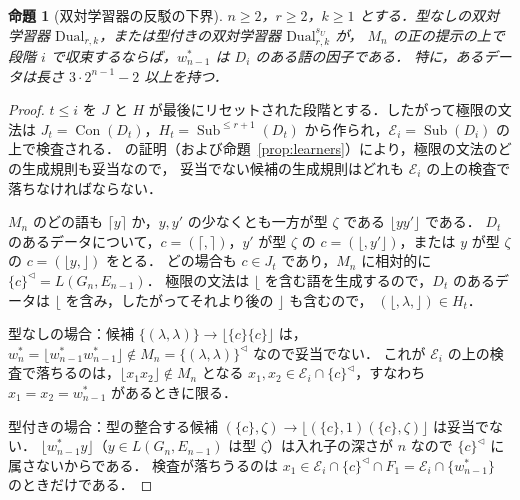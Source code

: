\documentclass[11pt,a4paper]{ltjsarticle}
\numberwithin{equation}{section}
\theoremstyle{plain}
\newtheorem{proposition}[theorem]{命題}
\theoremstyle{definition}
\theoremstyle{remark}
\theoremstyle{plain}
\newcommand{\eps}{\lambda}
\newcommand{\Lc}{^{\lhd}}
\newcommand{\Sub}{\operatorname{Sub}}
\newcommand{\Con}{\operatorname{Con}}
\newcommand{\Lfl}{\lfloor}
\newcommand{\Rfl}{\rfloor}
\newcommand{\Lce}{\lceil}
\newcommand{\Rce}{\rceil}
\begin{document}
\begin{proposition}[双対学習器の反駁の下界]
\label{prop:dual-refutation}
$n\ge2$，$r\ge2$，$k\ge1$ とする．型なしの双対学習器 $\mathrm{Dual}_{r,k}$，または型付きの双対学習器 $\mathrm{Dual}^{s_U}_{r,k}$ が，
$M_n$ の正の提示の上で段階 $i$ で収束するならば，$w^*_{n-1}$ は $D_i$ のある語の因子である．
特に，あるデータは長さ $3\cdot2^{n-1}-2$ 以上を持つ．
\end{proposition}
\begin{proof}
$t\le i$ を $J$ と $H$ が最後にリセットされた段階とする．したがって極限の文法は
$J_t=\Con(D_t)$，$H_t=\Sub^{\le r+1}(D_t)$ から作られ，$\mathcal E_i=\Sub(D_i)$ の上で検査される．
\citet[Thm.~3]{ky2017} の証明（および命題~\ref{prop:learners}）により，極限の文法のどの生成規則も妥当なので，
妥当でない候補の生成規則はどれも $\mathcal E_i$ の上の検査で落ちなければならない．

$M_n$ のどの語も $\Lce y\Rce$ か，$y,y'$ の少なくとも一方が型 $\zeta$ である $\Lfl yy'\Rfl$ である．
$D_t$ のあるデータについて，$c=(\Lce,\Rce)$，$y'$ が型 $\zeta$ の $c=(\Lfl,y'\Rfl)$，または $y$ が型 $\zeta$ の $c=(\Lfl y,\Rfl)$ をとる．
どの場合も $c\in J_t$ であり，$M_n$ に相対的に $\{c\}\Lc=L(G_n,E_{n-1})$．
極限の文法は $\Lfl$ を含む語を生成するので，$D_t$ のあるデータは $\Lfl$ を含み，したがってそれより後の $\Rfl$ も含むので，
$(\Lfl,\eps,\Rfl)\in H_t$．

型なしの場合：候補 $\{(\eps,\eps)\}\to\Lfl\{c\}\{c\}\Rfl$ は，$w^*_n=\Lfl w^*_{n-1}w^*_{n-1}\Rfl\notin M_n=\{(\eps,\eps)\}\Lc$ なので妥当でない．
これが $\mathcal E_i$ の上の検査で落ちるのは，$\Lfl x_1x_2\Rfl\notin M_n$ となる $x_1,x_2\in \mathcal E_i\cap\{c\}\Lc$，すなわち $x_1=x_2=w^*_{n-1}$ があるときに限る．

型付きの場合：型の整合する候補 $(\{c\},\zeta)\to\Lfl(\{c\},1)(\{c\},\zeta)\Rfl$ は妥当でない．
$\Lfl w^*_{n-1}y\Rfl$（$y\in L(G_n,E_{n-1})$ は型 $\zeta$）は入れ子の深さが $n$ なので $\{c\}\Lc$ に属さないからである．
検査が落ちうるのは $x_1\in \mathcal E_i\cap\{c\}\Lc\cap F_1=\mathcal E_i\cap\{w^*_{n-1}\}$ のときだけである．
\end{proof}
\end{document}
